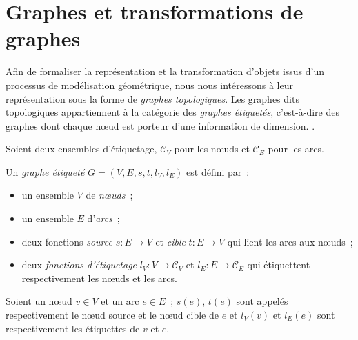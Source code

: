 \section[Graphes et transformations de graphes]{Graphes et transformations de graphes}
\label{sec:etat-art-model-regles-graphe-et-transfo}


Afin de formaliser la représentation et la transformation d'objets issus d'un
processus de modélisation géométrique, nous nous intéressons à leur
représentation sous la forme de \emph{graphes topologiques}. %
Les graphes dits topologiques appartiennent à la catégorie des \emph{graphes
  étiquetés}, c'est-à-dire des graphes dont chaque n\oe ud est porteur d'une
information de dimension. %
. %


\begin{definition}
	\label{def:graphe-etiquete}
	Soient deux ensembles d'étiquetage, $\mathcal{C}_{V}$ pour les n\oe uds et $\mathcal{C}_{E}$ pour
	les arcs. %

	Un \emph{graphe étiqueté} $G=(V,E,s,t,l_{V},l_{E})$ est défini par~:
	\begin{itemize}
		\item un ensemble $V$ de \emph{n\oe uds}~;
		\item un ensemble $E$ d'\emph{arcs}~;
		\item deux fonctions \emph{source} $s : E \to V$ et \emph{cible} $t : E \to V$
		      qui lient les arcs aux n\oe uds~;
		\item deux \emph{fonctions d'étiquetage} $l_{V} : V \to \mathcal{C}_{V}$ et
		      $l_{E} : E \to \mathcal{C}_{E}$ qui étiquettent respectivement les n\oe uds et les
		      arcs.%
	\end{itemize}
	Soient un n\oe ud $v \in V$ et un arc $e \in E$~; $s(e)$, $t(e)$ sont appelés
	respectivement le n\oe ud source et le n\oe ud cible de $e$ et $l_{V}(v)$ et
	$l_{E}(e)$ sont respectivement les étiquettes de $v$ et $e$.
\end{definition}

